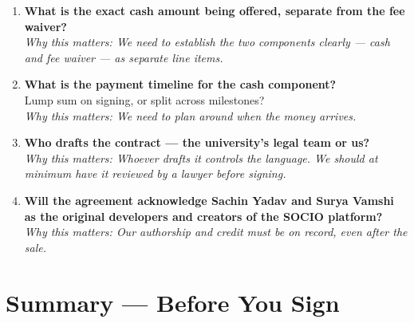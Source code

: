 \documentclass[12pt,a4paper]{article}
\begin{document}
\begin{enumerate}[leftmargin=*, label=\textbf{Q\arabic*.}, resume]

    \item \textbf{What is the exact cash amount being offered, separate from the fee waiver?}\\
    \textit{Why this matters: We need to establish the two components clearly — cash and fee waiver — as separate line items.}

    \item \textbf{What is the payment timeline for the cash component?}\\
    Lump sum on signing, or split across milestones?\\
    \textit{Why this matters: We need to plan around when the money arrives.}

    \item \textbf{Who drafts the contract — the university's legal team or us?}\\
    \textit{Why this matters: Whoever drafts it controls the language. We should at minimum have it reviewed by a lawyer before signing.}

    \item \textbf{Will the agreement acknowledge Sachin Yadav and Surya Vamshi as the original developers and creators of the SOCIO platform?}\\
    \textit{Why this matters: Our authorship and credit must be on record, even after the sale.}

\end{enumerate}

\newpage
\section{Summary — Before You Sign}
\end{document}
